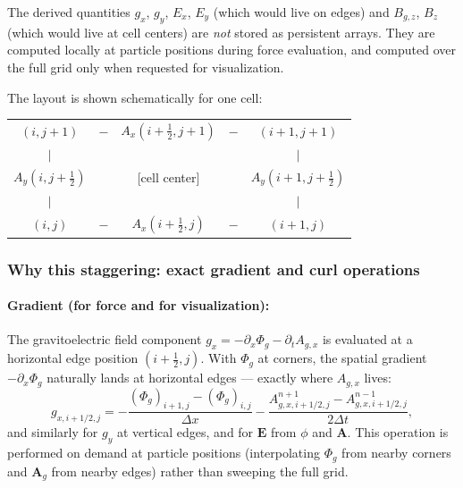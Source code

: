 \documentclass[11pt,a4paper]{article}
\newcommand{\vv}[1]{\mathbf{#1}}
\newcommand{\Phig}{\Phi_g}
\newcommand{\Ag}{\vv{A}_g}
\begin{document}
The derived quantities $g_x$, $g_y$, $E_x$, $E_y$ (which would live on edges) and $B_{g,z}$, $B_z$ (which would live at cell centers) are \emph{not} stored as persistent arrays.  They are computed locally at particle positions during force evaluation, and computed over the full grid only when requested for visualization.

The layout is shown schematically for one cell:

\begin{center}
\begin{tabular}{ccccc}
$(i,j+1)$ & $-$ & $A_x(i+\tfrac{1}{2},j+1)$ & $-$ & $(i+1,j+1)$ \\
$|$ & & & & $|$ \\
$A_y(i,j+\tfrac{1}{2})$ & & [cell center] & & $A_y(i+1,j+\tfrac{1}{2})$ \\
$|$ & & & & $|$ \\
$(i,j)$ & $-$ & $A_x(i+\tfrac{1}{2},j)$ & $-$ & $(i+1,j)$
\end{tabular}
\end{center}

\subsubsection*{Why this staggering: exact gradient and curl operations}

\paragraph{Gradient (for force and for visualization):}
The gravitoelectric field component $g_x = -\partial_x\Phig - \partial_t A_{g,x}$ is evaluated at a horizontal edge position $(i+\tfrac{1}{2}, j)$.  With $\Phig$ at corners, the spatial gradient $-\partial_x\Phig$ naturally lands at horizontal edges --- exactly where $A_{g,x}$ lives:
\begin{equation}
\label{eq:yee_grad}
  g_{x,i+1/2,j} = -\frac{(\Phig)_{i+1,j} - (\Phig)_{i,j}}{\Delta x}
                  - \frac{A_{g,x,i+1/2,j}^{n+1} - A_{g,x,i+1/2,j}^{n-1}}{2\Delta t},
\end{equation}
and similarly for $g_y$ at vertical edges, and for $\vv{E}$ from $\phi$ and $\vv{A}$.  This operation is performed on demand at particle positions (interpolating $\Phig$ from nearby corners and $\Ag$ from nearby edges) rather than sweeping the full grid.
\end{document}
